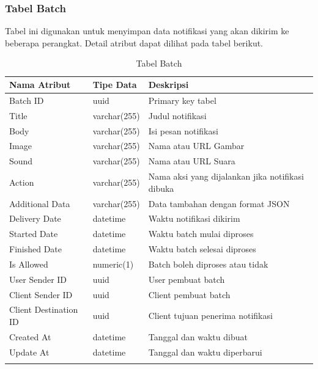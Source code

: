 \subsubsection{Tabel Batch}
\par Tabel ini digunakan untuk menyimpan data notifikasi yang akan dikirim ke beberapa perangkat. Detail atribut dapat dilihat pada tabel berikut.
\begin{longtable}{|p{2.5cm}|p{2cm}|p{4.5cm}|}
    \hline
    \textbf{Nama Atribut} & \textbf{Tipe Data} & \textbf{Deskripsi} \\ \hline
    Batch ID & uuid & Primary key tabel \\ \hline
    Title & varchar(255) & Judul notifikasi \\ \hline
    Body & varchar(255) & Isi pesan notifikasi \\ \hline
    Image & varchar(255) & Nama atau URL Gambar \\ \hline
    Sound & varchar(255) & Nama atau URL Suara \\ \hline
    Action & varchar(255) & Nama aksi yang dijalankan jika notifikasi dibuka \\ \hline
    Additional Data & varchar(255) & Data tambahan dengan format JSON \\ \hline
    Delivery Date & datetime & Waktu notifikasi dikirim \\ \hline
    Started Date & datetime & Waktu batch mulai diproses \\ \hline
    Finished Date & datetime & Waktu batch selesai diproses \\ \hline
    Is Allowed & numeric(1) & Batch boleh diproses atau tidak \\ \hline
    User Sender ID & uuid & User pembuat batch \\ \hline
    Client Sender ID & uuid & Client pembuat batch \\ \hline
    Client Destination ID & uuid & Client tujuan penerima notifikasi \\ \hline
    Created At & datetime & Tanggal dan waktu dibuat \\ \hline
    Update At & datetime & Tanggal dan waktu diperbarui \\ \hline
    \caption{Tabel Batch}
\end{longtable}

